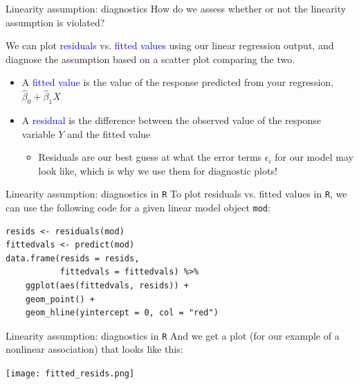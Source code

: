 \documentclass[10pt,t]{beamer}
\begin{document}
\begin{frame}{Linearity assumption: diagnostics}
How do we assess whether or not the linearity assumption is violated?

\vspace{0.3cm}

We can plot \textcolor{blue}{residuals} vs. \textcolor{blue}{fitted values} using our linear regression output, and diagnose the assumption based on a scatter plot comparing the two.

\vspace{0.3cm}

\begin{itemize}
	\item A \textcolor{blue}{fitted value} is the value of the response predicted from your regression, $\hat{\beta}_0 + \hat{\beta}_1 X$
	\item A \textcolor{blue}{residual} is the difference between the observed value of the response variable $Y$ and the fitted value
	\begin{itemize}
		\item[] Residuals are our best guess at what the error terms $\epsilon_i$ for our model may look like, which is why we use them for diagnostic plots!
	\end{itemize}
\end{itemize}
\end{frame}

\begin{frame}[fragile]{Linearity assumption: diagnostics in \texttt{R}}
To plot residuals vs. fitted values in \texttt{R}, we can use the following code for a given linear model object \texttt{mod}:

\vspace{0.2cm}

\begin{lstlisting}
resids <- residuals(mod)
fittedvals <- predict(mod)
data.frame(resids = resids,
           fittedvals = fittedvals) %>%
	ggplot(aes(fittedvals, resids)) +
	geom_point() +
	geom_hline(yintercept = 0, col = "red") 
\end{lstlisting}


\end{frame}

\begin{frame}{Linearity assumption: diagnostics in \texttt{R}}
And we get a plot (for our example of a nonlinear association) that looks like this:

\centering \texttt{[image: fitted\_resids.png]}

\end{frame}
\end{document}
